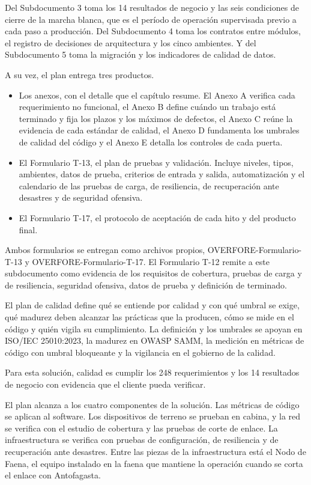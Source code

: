 \documentclass[subdoc]{../../comun/overfore}
\begin{document}
Del Subdocumento 3 toma los 14 resultados de negocio y las seis condiciones de cierre de la marcha blanca, que es el período de operación supervisada previo a cada paso a producción. Del Subdocumento 4 toma los contratos entre módulos, el registro de decisiones de arquitectura y los cinco ambientes. Y del Subdocumento 5 toma la migración y los indicadores de calidad de datos.

A su vez, el plan entrega tres productos.

\begin{itemize}
\item Los anexos, con el detalle que el capítulo resume. El Anexo A verifica cada requerimiento no funcional, el Anexo B define cuándo un trabajo está terminado y fija los plazos y los máximos de defectos, el Anexo C reúne la evidencia de cada estándar de calidad, el Anexo D fundamenta los umbrales de calidad del código y el Anexo E detalla los controles de cada puerta.
\item El Formulario T-13, el plan de pruebas y validación. Incluye niveles, tipos, ambientes, datos de prueba, criterios de entrada y salida, automatización y el calendario de las pruebas de carga, de resiliencia, de recuperación ante desastres y de seguridad ofensiva.
\item El Formulario T-17, el protocolo de aceptación de cada hito y del producto final.
\end{itemize}
Ambos formularios se entregan como archivos propios, OVERFORE-Formulario-T-13 y OVERFORE-Formulario-T-17. El Formulario T-12 remite a este subdocumento como evidencia de los requisitos de cobertura, pruebas de carga y de resiliencia, seguridad ofensiva, datos de prueba y definición de terminado.

El plan de calidad define qué se entiende por calidad y con qué umbral se exige, qué madurez deben alcanzar las prácticas que la producen, cómo se mide en el código y quién vigila su cumplimiento. La definición y los umbrales se apoyan en ISO/IEC 25010:2023, la madurez en OWASP SAMM, la medición en métricas de código con umbral bloqueante y la vigilancia en el gobierno de la calidad.

Para esta solución, calidad es cumplir los 248 requerimientos y los 14 resultados de negocio con evidencia que el cliente pueda verificar.

El plan alcanza a los cuatro componentes de la solución. Las métricas de código se aplican al software. Los dispositivos de terreno se prueban en cabina, y la red se verifica con el estudio de cobertura y las pruebas de corte de enlace. La infraestructura se verifica con pruebas de configuración, de resiliencia y de recuperación ante desastres. Entre las piezas de la infraestructura está el Nodo de Faena, el equipo instalado en la faena que mantiene la operación cuando se corta el enlace con Antofagasta.
\end{document}
